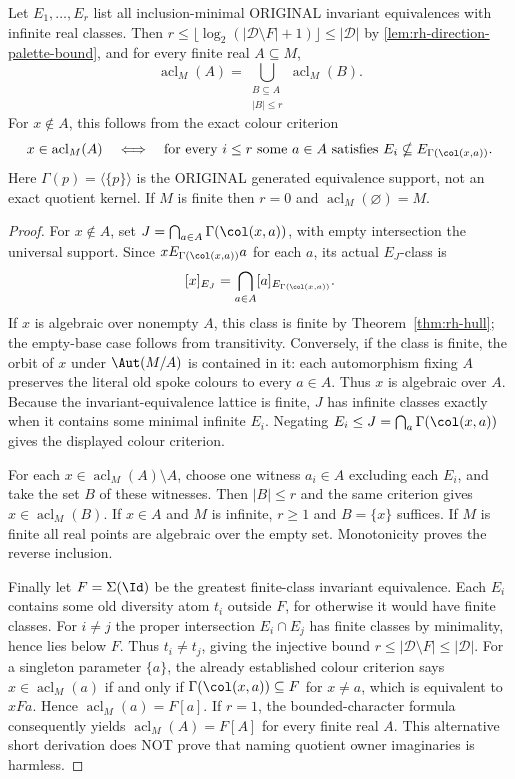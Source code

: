 \begin{corollary}
\label{cor:rh-acl-bounded-character}
Let $E_1,\ldots,E_r$ list all inclusion-minimal ORIGINAL invariant
equivalences with infinite real classes.  Then
$r\le\lfloor\log_2(|\mathcal D\setminus F|+1)\rfloor\le|\mathcal D|$
by \cref{lem:rh-direction-palette-bound}, and
for every finite real $A\subseteq M$,
\[
   \operatorname{acl}_M(A)=
   \bigcup_{\substack{B\subseteq A\\|B|\le r}}
                 \operatorname{acl}_M(B).
\]
For $x\notin A$, this follows from the exact colour criterion
\[
 x\in\operatorname{acl}_M(A)
 \quad\Longleftrightarrow\quad
 \text{for every }i\le r\text{ some }a\in A
 \text{ satisfies }E_i\nsubseteq
       E_{\Gamma(\col(x,a))}.
\]
Here $\Gamma(p)=\langle\{p\}\rangle$ is the ORIGINAL generated
equivalence support, not an exact quotient kernel.  If $M$ is
finite then $r=0$ and $\operatorname{acl}_M(\varnothing)=M$.
\end{corollary}
\begin{proof}
For $x\notin A$, set
$J=\bigcap_{a\in A}\Gamma(\col(x,a))$, with empty intersection
the universal support.  Since
$xE_{\Gamma(\col(x,a))}a$ for each $a$, its actual $E_J$-class is
\[
 [x]_{E_J}=
       \bigcap_{a\in A}[a]_{E_{\Gamma(\col(x,a))}}.
\]
If $x$ is algebraic over nonempty $A$, this class is finite by
Theorem~\ref{thm:rh-hull}; the empty-base case follows from
transitivity.  Conversely, if the class is finite, the orbit of
$x$ under $\Aut(M/A)$ is contained in it: each automorphism
fixing $A$ preserves the literal old spoke colours to every
$a\in A$.  Thus $x$ is algebraic over $A$.
Because the invariant-equivalence lattice is finite, $J$
has infinite classes exactly when it contains some minimal
infinite $E_i$.  Negating
$E_i\le J=\bigcap_a\Gamma(\col(x,a))$ gives the displayed
colour criterion.

For each $x\in\operatorname{acl}_M(A)\setminus A$, choose one
witness $a_i\in A$ excluding each $E_i$, and take the set $B$
of these witnesses.  Then $|B|\le r$ and the same criterion
gives $x\in\operatorname{acl}_M(B)$.  If $x\in A$ and $M$
is infinite, $r\ge1$ and $B=\{x\}$ suffices.  If $M$ is
finite all real points are algebraic over the empty set.
Monotonicity proves the reverse inclusion.

Finally let $F=\Sigma(\Id)$ be the greatest finite-class
invariant equivalence.  Each $E_i$ contains some old
diversity atom $t_i$ outside $F$, for otherwise it would
have finite classes.  For $i\ne j$ the proper intersection
$E_i\cap E_j$ has finite classes by minimality, hence lies
below $F$.  Thus $t_i\ne t_j$, giving the injective bound
$r\le|\mathcal D\setminus F|\le|\mathcal D|$.
For a singleton parameter $\{a\}$, the already established
colour criterion says
$x\in\operatorname{acl}_M(a)$ if and only if
$\Gamma(\col(x,a))\subseteq F$ for $x\ne a$,
which is equivalent to $xFa$.
Hence $\operatorname{acl}_M(a)=F[a]$.
If $r=1$, the bounded-character formula consequently yields
$\operatorname{acl}_M(A)=F[A]$ for every finite real $A$.
This alternative short derivation does NOT prove that naming
quotient owner imaginaries is harmless.
\end{proof}

